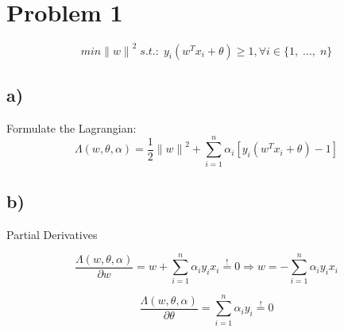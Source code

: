 \documentclass[12pt]{article}
\newcommand{\mysum}[2]{\sum_{#1 = 1}^{n}  #2}
\newcommand{\kersum}[1]{\sum_{#1 = 1}^{n}  \alpha_{#1} y_{#1} x_{#1}}
\begin{document}
\section*{Problem 1}

\begin{equation}
min {\lVert w\rVert}^2 \; s.t.: \;  y_i\left(w^Tx_i + \theta\right)  \geq 1, \forall i \in \{1,\; ...,\; n\}
\end{equation}

\subsection*{a)}
Formulate the Lagrangian:
\begin{equation}
\label{primal}
\Lambda\left(w, \theta, \alpha\right)=\frac{1}{2}{\lVert w\rVert}^2 + 
    \mysum{i}{\alpha_i \left[y_i\left(w^Tx_i + \theta\right) - 1\right]}
\end{equation}

\subsection*{b)}
Partial Derivatives

\begin{equation}
\label{prt1}
\frac{\Lambda\left(w, \theta, \alpha\right)}{\partial w} 
    = w + \mysum{i}{\alpha_i y_i x_i} \stackrel{!}{=} 0 
    \Rightarrow w = - \kersum{i}
\end{equation}

\begin{equation}
\label{prt2}
\frac{\Lambda\left(w, \theta, \alpha\right)}{\partial \theta} 
    = \mysum{i}{\alpha_i y_i} \stackrel{!}{=} 0 
\end{equation}
\end{document}
